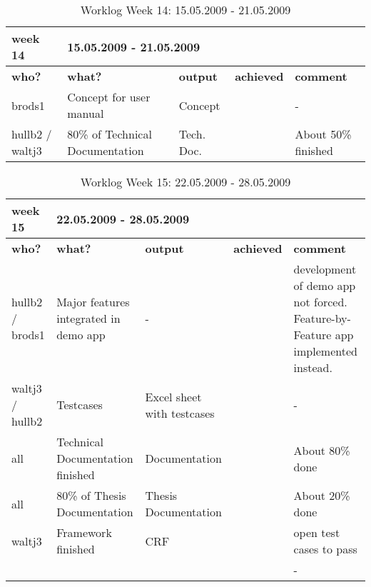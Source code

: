 \begin{table}[H]
	\centering
	\begin{tabular}{|b{}|p{}|p{}|p{}|p{}|}
		\hline \bfseries week 14 & \multicolumn{4}{l|}{\bfseries 15.05.2009 - 21.05.2009} \\
		\hline
		\hline \bfseries who? & \bfseries what? & \bfseries output & \bfseries achieved & \bfseries comment \\ 
		\hline brods1 & Concept for user manual & Concept & \tick & \quad\quad- \\
		\hline hullb2 / waltj3 & 80\% of Technical Documentation & Tech. Doc. & \quad\quad\color{yellow}{\bfseries !} & About 50\% finished \\
		\hline
	\end{tabular}
	\caption{Worklog Week 14: 15.05.2009 - 21.05.2009}
\end{table}

\begin{table}[H]
	\centering
	\begin{tabular}{|b{}|p{}|p{}|p{}|p{}|}
		\hline \bfseries week 15 & \multicolumn{4}{l|}{\bfseries 22.05.2009 - 28.05.2009} \\
		\hline
		\hline \bfseries who? & \bfseries what? & \bfseries output & \bfseries achieved & \bfseries comment \\ 
		\hline hullb2 / brods1 & Major features integrated in demo app & \quad\quad- & \quad\quad\color{yellow}{\bfseries !} & development of demo app not forced. Feature-by-Feature app implemented instead. \\
		\hline waltj3 / hullb2 & Testcases & Excel sheet with testcases & \tick & \quad\quad- \\
		\hline all & Technical Documentation finished & Documentation & \quad\quad\color{yellow}{\bfseries !} & About 80\% done \\
		\hline all & 80\% of Thesis Documentation & Thesis Documentation & \quad\quad\color{yellow}{\bfseries !} & About 20\% done \\
		\hline waltj3 & Framework finished & CRF & \quad\quad\color{yellow}{\bfseries !} & open test cases to pass \\
		\hline
		\hline \color{red}{\bfseries M3} & \multicolumn{2}{l|}{\color{red}{\bfseries Development finished}} & \tick & \quad\quad- \\
		\hline
	\end{tabular}
	\caption{Worklog Week 15: 22.05.2009 - 28.05.2009}
\end{table}

